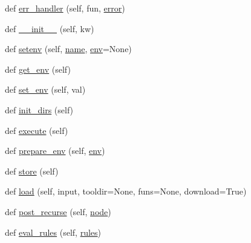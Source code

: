 \begin{DoxyCompactItemize}
\item 
def \hyperlink{classwaflib_1_1_configure_1_1_configuration_context_acc349b079382fdac3d626eb46bd54b7e}{err\+\_\+handler} (self, fun, \hyperlink{sndfile__save_8m_ada4b423bc19e6ff5c5b514e55f518a82}{error})
\item 
def \hyperlink{classwaflib_1_1_configure_1_1_configuration_context_a0f139855aa53920d6f30a05e10253ab0}{\+\_\+\+\_\+init\+\_\+\+\_\+} (self, kw)
\item 
def \hyperlink{classwaflib_1_1_configure_1_1_configuration_context_a2ed4960105cdf08c13cd178367ae1818}{setenv} (self, \hyperlink{lib_2expat_8h_a1b49b495b59f9e73205b69ad1a2965b0}{name}, \hyperlink{classwaflib_1_1_configure_1_1_configuration_context_a390267f6d3529fe07447ffb4925ca533}{env}=None)
\item 
def \hyperlink{classwaflib_1_1_configure_1_1_configuration_context_a5f2dfad34690147826b09413246140f7}{get\+\_\+env} (self)
\item 
def \hyperlink{classwaflib_1_1_configure_1_1_configuration_context_ad30b269279dd9c24e6d892bb3b2fc583}{set\+\_\+env} (self, val)
\item 
def \hyperlink{classwaflib_1_1_configure_1_1_configuration_context_a782925b68e221c10f8e08433329364c9}{init\+\_\+dirs} (self)
\item 
def \hyperlink{classwaflib_1_1_configure_1_1_configuration_context_a2dadcc441cc31bb49159c709bae0ec32}{execute} (self)
\item 
def \hyperlink{classwaflib_1_1_configure_1_1_configuration_context_a913063288a6135c3105acf180e7f0f0c}{prepare\+\_\+env} (self, \hyperlink{classwaflib_1_1_configure_1_1_configuration_context_a390267f6d3529fe07447ffb4925ca533}{env})
\item 
def \hyperlink{classwaflib_1_1_configure_1_1_configuration_context_aadaed27da973f44dde6eaa890026be35}{store} (self)
\item 
def \hyperlink{classwaflib_1_1_configure_1_1_configuration_context_ae13e6fac1db3060edb50337f97b7be3f}{load} (self, input, tooldir=None, funs=None, download=True)
\item 
def \hyperlink{classwaflib_1_1_configure_1_1_configuration_context_a9620736938604c56dc26964b06a24e2e}{post\+\_\+recurse} (self, \hyperlink{structnode}{node})
\item 
def \hyperlink{classwaflib_1_1_configure_1_1_configuration_context_af1b5fdd6d958f8b996dba916c44ec9fa}{eval\+\_\+rules} (self, \hyperlink{classwaflib_1_1_configure_1_1_configuration_context_a279ad5a7c2630c4416afc36cad85a2db}{rules})
\item 

\end{DoxyCompactItemize}
